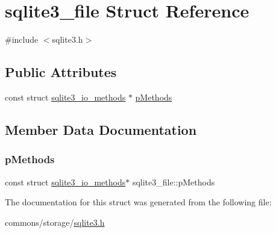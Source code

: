 \hypertarget{structsqlite3__file}{}\section{sqlite3\+\_\+file Struct Reference}
\label{structsqlite3__file}


{\ttfamily \#include $<$sqlite3.\+h$>$}

\subsection*{Public Attributes}
\begin{DoxyCompactItemize}
\item 
const struct \mbox{\hyperlink{structsqlite3__io__methods}{sqlite3\+\_\+io\+\_\+methods}} $\ast$ \mbox{\hyperlink{structsqlite3__file_adfc58b2d7514112375d7330e2881bc70}{p\+Methods}}
\end{DoxyCompactItemize}


\subsection{Member Data Documentation}
\mbox{\label{structsqlite3__file_adfc58b2d7514112375d7330e2881bc70}} 
\subsubsection{\texorpdfstring{pMethods}{pMethods}}
{\footnotesize\ttfamily const struct \mbox{\hyperlink{structsqlite3__io__methods}{sqlite3\+\_\+io\+\_\+methods}}$\ast$ sqlite3\+\_\+file\+::p\+Methods}



The documentation for this struct was generated from the following file\+:\begin{DoxyCompactItemize}
\item 
commons/storage/\mbox{\hyperlink{sqlite3_8h}{sqlite3.\+h}}\end{DoxyCompactItemize}
